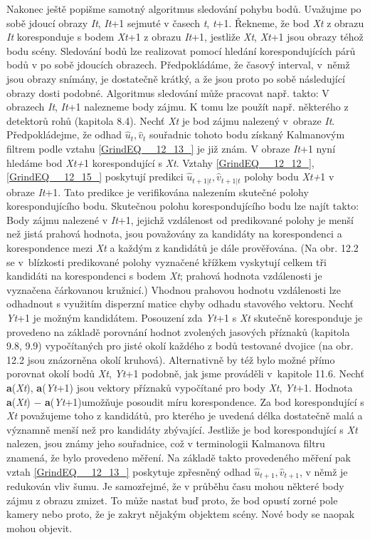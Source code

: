 \noindent Nakonec ještě popišme samotný algoritmus sledování pohybu bodů. Uvažujme po sobě jdoucí obrazy \textit{It}, \textit{It}+1 sejmuté v časech \textit{t}, \textit{t}+1. Řekneme, že bod \textit{Xt} z obrazu \textit{It} koresponduje s bodem \textit{Xt}+1 z obrazu \textit{It}+1, jestliže \textit{Xt}, \textit{Xt}+1 jsou obrazy téhož bodu scény. Sledování bodů lze realizovat pomocí hledání korespondujících párů bodů v po sobě jdoucích obrazech. Předpokládáme, že časový interval, v~němž jsou obrazy snímány, je dostatečně krátký, a že jsou proto po sobě následující obrazy dosti podobné. Algoritmus sledování může pracovat např. takto: V obrazech \textit{It}, \textit{It}+1 nalezneme body zájmu. K tomu lze použít např. některého z detektorů rohů (kapitola 8.4). Nechť \textit{Xt} je bod zájmu nalezený v~obraze \textit{It}. Předpokládejme, že odhad $\hat{u}_{t} ,\hat{v}_{t} $ souřadnic tohoto bodu získaný Kalmanovým filtrem podle vztahu \eqref{GrindEQ__12_13_} je již znám. V obraze \textit{It}+1 nyní hledáme bod \textit{Xt+}1 korespondující s \textit{Xt}. Vztahy \eqref{GrindEQ__12_12_}, \eqref{GrindEQ__12_15_} poskytují predikci $\hat{u}_{t+1\left|t\right. } ,\hat{v}_{t+1\left|t\right. } $ polohy bodu \textit{Xt+}1 v obraze \textit{It}+1. Tato predikce je verifikována nalezením skutečné polohy korespondujícího bodu. Skutečnou polohu korespondujícího bodu lze najít takto: Body zájmu nalezené v \textit{It}+1, jejichž vzdálenost od predikované polohy je menší než jistá prahová hodnota, jsou považovány za kandidáty na korespondenci a korespondence mezi \textit{Xt} a každým z kandidátů je dále prověřována. (Na obr. 12.2 se v~blízkosti predikované polohy vyznačené křížkem vyskytují celkem tři kandidáti na korespondenci s bodem \textit{Xt}; prahová hodnota vzdálenosti je vyznačena čárkovanou kružnicí.) Vhodnou prahovou hodnotu vzdálenosti lze odhadnout s využitím disperzní matice  chyby odhadu stavového vektoru. Nechť \textit{Yt}+1 je možným kandidátem. Posouzení zda \textit{Yt}+1 s \textit{Xt} skutečně koresponduje je provedeno na základě porovnání hodnot zvolených jasových příznaků (kapitola 9.8, 9.9) vypočítaných pro jisté okolí každého z bodů testované dvojice (na obr. 12.2 jsou znázorněna okolí kruhová). Alternativně by též bylo možné přímo porovnat okolí bodů \textit{Xt}, \textit{Yt}+1 podobně, jak jsme prováděli v~kapitole 11.6. Nechť \textbf{a}(\textit{Xt}), \textbf{a}(\textit{Yt}+1) jsou vektory příznaků vypočítané pro body \textit{Xt}, \textit{Yt}+1. Hodnota \textbar \textbf{a}(\textit{Xt}) $-$ \textbf{a}(\textit{Yt}+1)\textbar  umožňuje posoudit míru korespondence. Za bod korespondující s \textit{Xt} považujeme toho z kandidátů, pro kterého je uvedená délka dostatečně malá a významně menší než pro kandidáty zbývající. Jestliže je bod korespondující s \textit{Xt} nalezen, jsou známy jeho souřadnice, což v terminologii Kalmanova filtru znamená, že bylo provedeno měření. Na základě takto provedeného měření pak vztah \eqref{GrindEQ__12_13_} poskytuje zpřesněný odhad $\hat{u}_{t+1} ,\hat{v}_{t+1} $, v němž je redukován vliv šumu. Je samozřejmé, že v průběhu času mohou některé body zájmu z obrazu zmizet. To může nastat buď proto, že bod opustí zorné pole kamery nebo proto, že je zakryt nějakým objektem scény. Nové body se naopak mohou objevit.

